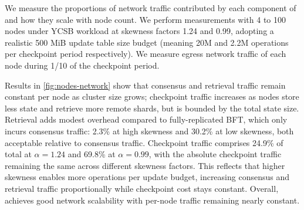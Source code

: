 We measure the proportions of network traffic contributed by each component of \sys and how they scale with node count.
We perform measurements with 4 to 100 nodes under YCSB workload at skewness factors 1.24 and 0.99, adopting a realistic 500 MiB update table size budget (meaning 20M and 2.2M operations per checkpoint period respectively).
We measure egress network traffic of each node during 1/10 of the checkpoint period.

Results in \cref{fig:nodes-network} show that consensus and retrieval traffic remain constant per node as cluster size grows; checkpoint traffic increases as nodes store less state and retrieve more remote shards, but is bounded by the total state size.
Retrieval adds modest overhead compared to fully-replicated BFT, which only incurs consensus traffic: 2.3\% at high skewness and 30.2\% at low skewness, both acceptable relative to consensus traffic.
Checkpoint traffic comprises 24.9\% of total at $\alpha=1.24$ and 69.8\% at $\alpha=0.99$, with the absolute checkpoint traffic remaining the same across different skewness factors. This reflects that higher skewness enables more operations per update budget, increasing consensus and retrieval traffic proportionally while checkpoint cost stays constant.
Overall, \sys achieves good network scalability with per-node traffic remaining nearly constant.